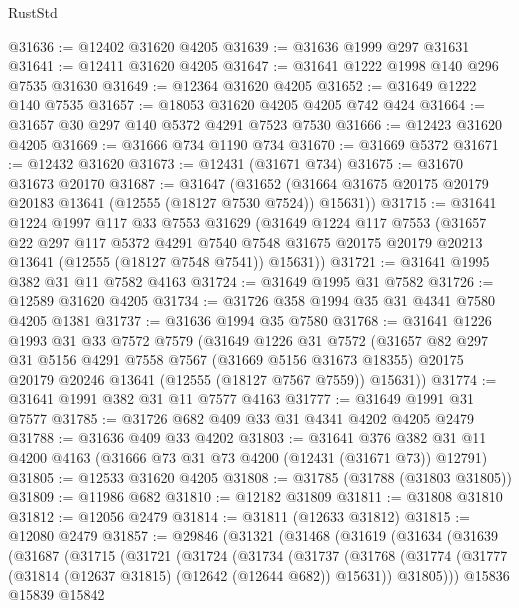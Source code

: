 \begin{lexlean}{RustStd}
\begin{coremodule}
@31636 := @12402 @31620 @4205
@31639 := @31636 @1999 @297 @31631
@31641 := @12411 @31620 @4205
@31647 := @31641 @1222 @1998 @140 @296 @7535 @31630
@31649 := @12364 @31620 @4205
@31652 := @31649 @1222 @140 @7535
@31657 := @18053 @31620 @4205 @4205 @742 @424
@31664 := @31657 @30 @297 @140 @5372 @4291 @7523 @7530
@31666 := @12423 @31620 @4205
@31669 := @31666 @734 @1190 @734
@31670 := @31669 @5372
@31671 := @12432 @31620
@31673 := @12431 (@31671 @734)
@31675 := @31670 @31673 @20170
@31687 := @31647
    (@31652 (@31664 @31675 @20175 @20179 @20183 @13641 (@12555 (@18127 @7530 @7524)) @15631))
@31715 := @31641
    @1224
    @1997
    @117
    @33
    @7553
    @31629
    (@31649
      @1224
      @117
      @7553
      (@31657
        @22
        @297
        @117
        @5372
        @4291
        @7540
        @7548
        @31675
        @20175
        @20179
        @20213
        @13641
        (@12555 (@18127 @7548 @7541))
        @15631))
@31721 := @31641 @1995 @382 @31 @11 @7582 @4163
@31724 := @31649 @1995 @31 @7582
@31726 := @12589 @31620 @4205
@31734 := @31726 @358 @1994 @35 @31 @4341 @7580 @4205 @1381
@31737 := @31636 @1994 @35 @7580
@31768 := @31641
    @1226
    @1993
    @31
    @33
    @7572
    @7579
    (@31649
      @1226
      @31
      @7572
      (@31657
        @82
        @297
        @31
        @5156
        @4291
        @7558
        @7567
        (@31669 @5156 @31673 @18355)
        @20175
        @20179
        @20246
        @13641
        (@12555 (@18127 @7567 @7559))
        @15631))
@31774 := @31641 @1991 @382 @31 @11 @7577 @4163
@31777 := @31649 @1991 @31 @7577
@31785 := @31726 @682 @409 @33 @31 @4341 @4202 @4205 @2479
@31788 := @31636 @409 @33 @4202
@31803 := @31641
    @376
    @382
    @31
    @11
    @4200
    @4163
    (@31666 @73 @31 @73 @4200 (@12431 (@31671 @73)) @12791)
@31805 := @12533 @31620 @4205
@31808 := @31785 (@31788 (@31803 @31805))
@31809 := @11986 @682
@31810 := @12182 @31809
@31811 := @31808 @31810
@31812 := @12056 @2479
@31814 := @31811 (@12633 @31812)
@31815 := @12080 @2479
@31857 := @29846
    (@31321
      (@31468
        (@31619
          (@31634
            (@31639
              (@31687
                (@31715
                  (@31721
                    (@31724
                      (@31734
                        (@31737
                          (@31768
                            (@31774
                              (@31777 (@31814 (@12637 @31815) (@12642 (@12644 @682)) @15631))
                              @31805)))
                        @15836
                        @15839
                        @15842

\end{coremodule}
\end{lexlean}
